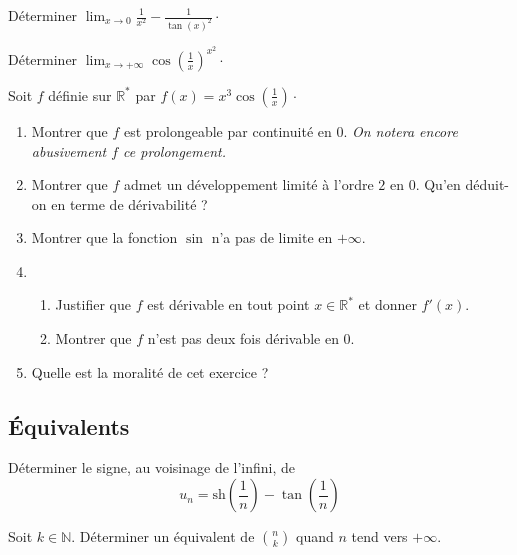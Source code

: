 \documentclass[a4paper,twoside,french,11pt]{VcCours}
\begin{document}
\begin{Exercice} Déterminer $\lim_{x \rightarrow 0} \frac{1}{x^2} - \frac{1}{\tan(x)^2} \cdot$
\end{Exercice} 



\begin{Exercice} Déterminer $\lim_{x \rightarrow + \infty}  \cos \left( \frac{1}{x} \right)^{x^2} \cdot$
\end{Exercice}



\begin{Exercice}[$\bigstar$] Soit $f$ définie sur $\mathbb{R}^*$ par 
  $f(x) = x^3 \cos \left( \frac{1}{x} \right) \cdot$

\begin{enumerate}
\item Montrer que $f$ est prolongeable par continuité en $0$. 
\textit{On notera encore abusivement $f$ ce prolongement.}
\item Montrer que $f$ admet un développement limité à l'ordre $2$ en $0$. 
Qu'en déduit-on en terme de dérivabilité ?
\item Montrer que la fonction $\sin$ n'a pas de limite en $+ \infty$. 
\item 
\begin{enumerate}
\item Justifier que $f$ est dérivable en tout point $x \in \mathbb{R}^*$ et donner $f'(x)$.
\item Montrer que $f$ n'est pas deux fois dérivable en $0$.
\end{enumerate}
\item Quelle est la moralité de cet exercice ?
\end{enumerate}
\end{Exercice} 



\subsection{Équivalents}


\begin{Exercice} D\'{e}terminer le signe, au voisinage de l'infini, de 
$$u_{n}=\text{sh}\left( \dfrac{1}{n}\right) -\tan \left( \dfrac{1}{n}\right)$$
\end{Exercice}




\begin{Exercice} Soit $k \in \mathbb{N}$. Déterminer un équivalent de $\binom{n}{k}$ quand $n$ tend vers $+ \infty$. 
\end{Exercice}
\end{document}
